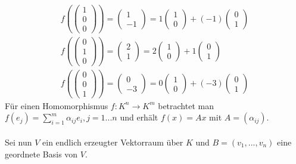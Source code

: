\begin{align}
f(\begin{pmatrix} 1 \\ 0 \\ 0 \end{pmatrix}) = \begin{pmatrix} 1 \\ -1 \end{pmatrix} = 1 \begin{pmatrix} 1 \\ 0 \end{pmatrix} + (-1) \begin{pmatrix} 0 \\ 1 \end{pmatrix} \\
f(\begin{pmatrix} 0 \\ 1 \\ 0 \end{pmatrix}) = \begin{pmatrix} 2 \\ 1 \end{pmatrix} = 2 \begin{pmatrix} 1 \\ 0 \end{pmatrix} + 1 \begin{pmatrix} 0 \\ 1 \end{pmatrix} \\
f(\begin{pmatrix} 0 \\ 0 \\ 1 \end{pmatrix}) = \begin{pmatrix} 0 \\ -3 \end{pmatrix} = 0 \begin{pmatrix} 1 \\ 0 \end{pmatrix} + (-3) \begin{pmatrix} 0 \\ 1 \end{pmatrix}
\end{align}
Für einen Homomorphismus $f: K^n \rightarrow K^m$ betrachtet man $f(e_j) = \sum_{i=1}^{m} \alpha_{ij} e_i, j=1...n$ und erhält $f(x) = Ax$ mit $A = (\alpha_{ij})$.\\\\
Sei nun $V$ ein endlich erzeugter Vektorraum über $K$ und $B = (v_1, ..., v_n)$ eine geordnete Basis von $V$.

